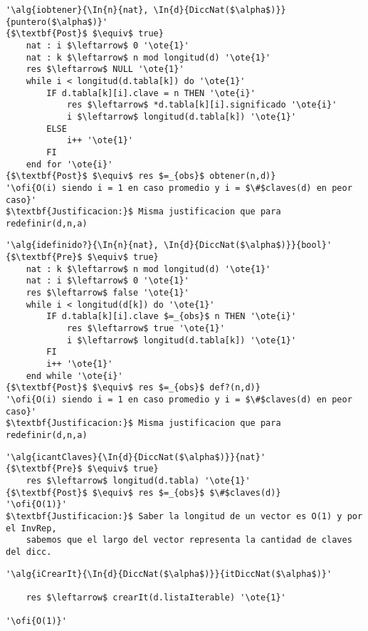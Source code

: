 \begin{lstlisting}[mathescape]
'\alg{iobtener}{\In{n}{nat}, \In{d}{DiccNat($\alpha$)}}{puntero($\alpha$)}'
{$\textbf{Post}$ $\equiv$ true}
	nat : i $\leftarrow$ 0 '\ote{1}'
	nat : k $\leftarrow$ n mod longitud(d) '\ote{1}'
	res $\leftarrow$ NULL '\ote{1}'
	while i < longitud(d.tabla[k]) do '\ote{1}'
		IF d.tabla[k][i].clave = n THEN '\ote{i}'
			res $\leftarrow$ *d.tabla[k][i].significado '\ote{i}'
			i $\leftarrow$ longitud(d.tabla[k]) '\ote{1}'
		ELSE
			i++ '\ote{1}'
		FI
	end for '\ote{i}'
{$\textbf{Post}$ $\equiv$ res $=_{obs}$ obtener(n,d)}
'\ofi{O(i) siendo i = 1 en caso promedio y i = $\#$claves(d) en peor caso}'
$\textbf{Justificacion:}$ Misma justificacion que para redefinir(d,n,a)
\end{lstlisting}

\begin{lstlisting}[mathescape]
'\alg{idefinido?}{\In{n}{nat}, \In{d}{DiccNat($\alpha$)}}{bool}'
{$\textbf{Pre}$ $\equiv$ true}
	nat : k $\leftarrow$ n mod longitud(d) '\ote{1}'
	nat : i $\leftarrow$ 0 '\ote{1}'
	res $\leftarrow$ false '\ote{1}'
	while i < longitud(d[k]) do '\ote{1}'
		IF d.tabla[k][i].clave $=_{obs}$ n THEN '\ote{i}'
			res $\leftarrow$ true '\ote{1}'
			i $\leftarrow$ longitud(d.tabla[k]) '\ote{1}'
		FI
		i++ '\ote{1}'
	end while '\ote{i}'
{$\textbf{Post}$ $\equiv$ res $=_{obs}$ def?(n,d)}
'\ofi{O(i) siendo i = 1 en caso promedio y i = $\#$claves(d) en peor caso}'
$\textbf{Justificacion:}$ Misma justificacion que para redefinir(d,n,a)
\end{lstlisting}

\begin{lstlisting}[mathescape]
'\alg{icantClaves}{\In{d}{DiccNat($\alpha$)}}{nat}'
{$\textbf{Pre}$ $\equiv$ true}
	res $\leftarrow$ longitud(d.tabla) '\ote{1}'
{$\textbf{Post}$ $\equiv$ res $=_{obs}$ $\#$claves(d)}
'\ofi{O(1)}'
$\textbf{Justificacion:}$ Saber la longitud de un vector es O(1) y por el InvRep,
	sabemos que el largo del vector representa la cantidad de claves del dicc.
\end{lstlisting}

%
%

\begin{lstlisting}[mathescape]
'\alg{iCrearIt}{\In{d}{DiccNat($\alpha$)}}{itDiccNat($\alpha$)}'

	res $\leftarrow$ crearIt(d.listaIterable) '\ote{1}'

'\ofi{O(1)}'
\end{lstlisting}

